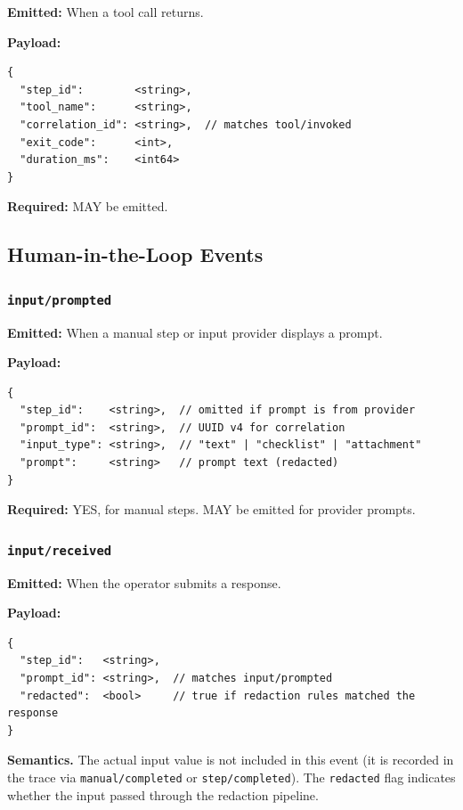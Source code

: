 \textbf{Emitted:} When a tool call returns.

\textbf{Payload:}
\begin{verbatim}
{
  "step_id":        <string>,
  "tool_name":      <string>,
  "correlation_id": <string>,  // matches tool/invoked
  "exit_code":      <int>,
  "duration_ms":    <int64>
}
\end{verbatim}

\textbf{Required:} MAY be emitted.


\subsection{Human-in-the-Loop Events}

\subsubsection{\texttt{input/prompted}}

\textbf{Emitted:} When a manual step or input provider displays a prompt.

\textbf{Payload:}
\begin{verbatim}
{
  "step_id":    <string>,  // omitted if prompt is from provider
  "prompt_id":  <string>,  // UUID v4 for correlation
  "input_type": <string>,  // "text" | "checklist" | "attachment"
  "prompt":     <string>   // prompt text (redacted)
}
\end{verbatim}

\textbf{Required:} YES, for manual steps. MAY be emitted for provider prompts.


\subsubsection{\texttt{input/received}}

\textbf{Emitted:} When the operator submits a response.

\textbf{Payload:}
\begin{verbatim}
{
  "step_id":   <string>,
  "prompt_id": <string>,  // matches input/prompted
  "redacted":  <bool>     // true if redaction rules matched the response
}
\end{verbatim}

\textbf{Semantics.} The actual input value is not included in this event (it is recorded in the trace via \texttt{manual/completed} or \texttt{step/completed}). The \texttt{redacted} flag indicates whether the input passed through the redaction pipeline.


